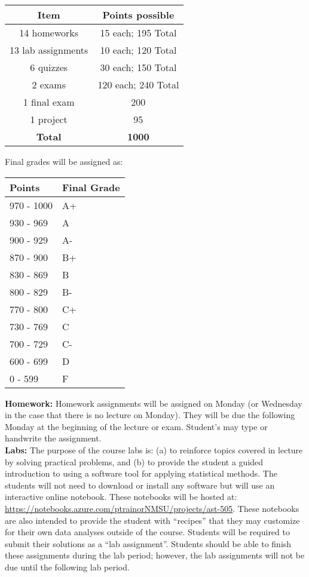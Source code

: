 \documentclass{article}
\begin{document}
\begin{center}
	\begin{tabular}{cc}
		\textbf{Item} & \textbf{Points possible} \\
		\hline
		14 homeworks & 15 each; 195 Total\\
		13 lab assignments & 10 each; 120 Total \\
		6 quizzes & 30 each; 150 Total \\
		2 exams & 120 each; 240 Total \\
		1 final exam & 200 \\
		1 project & 95 \\
		\hline
		\textbf{Total} & \textbf{1000}\\
	\end{tabular}
\end{center}

Final grades will be assigned as:
\begin{center}
	\begin{tabular}{p{2cm}p{2.5cm}}
		\textbf{Points} & \textbf{Final Grade} \\ \hline
		970 - 1000 & A+ \\
		930 - 969 & A \\
		900 - 929 & A- \\
		870 - 900 & B+ \\
		830 - 869 & B \\
		800 - 829 & B- \\
		770 - 800 & C+ \\
		730 - 769 & C \\
		700 - 729 & C- \\
		600 - 699 & D \\
		0 - 599 & F \\ \hline
	\end{tabular}
\end{center}

\noindent\textbf{Homework:} Homework assignments will be assigned on Monday (or Wednesday in the case that there is no lecture on Monday). They will be due the following Monday at the beginning of the lecture or exam. Student's may type or handwrite the assignment. \\

\noindent\textbf{Labs:} The purpose of the course labs is: (a) to reinforce topics covered in lecture by solving practical problems, and (b) to provide the student a guided introduction to using a software tool for applying statistical methods. The students will not need to download or install any software but will use an interactive online notebook. These notebooks will be hosted at: \url{https://notebooks.azure.com/ptrainorNMSU/projects/ast-505}. These notebooks are also intended to provide the student with ``recipes'' that they may customize for their own data analyses outside of the course. Students will be required to submit their solutions as a ``lab assignment''. Students should be able to finish these assignments during the lab period; however, the lab assignments will not be due until the following lab period.  \\
\end{document}
